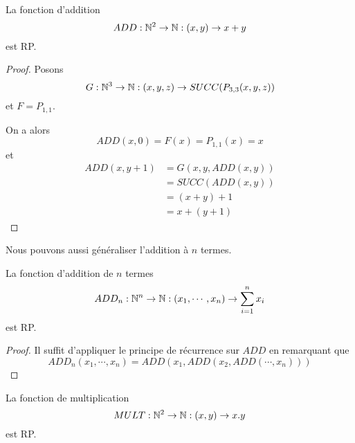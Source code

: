 \begin{exemple} [Addition]
	La fonction d'addition
	\begin{equation}
		ADD : \mathbb{N}^{2} \rightarrow \mathbb{N} : (x, y) \rightarrow x + y
	\end{equation}
	est RP.
\end{exemple}

\ifdefined\outputproof
\begin{proof}
	Posons
	\begin{equation}
		G : \mathbb{N}^{3} \rightarrow \mathbb{N} : (x, y, z) \rightarrow SUCC(P_{3,
		3}(x, y, z))
	\end{equation}
	et $F = P_{1, 1}$.

	On a alors
	\begin{equation}
		ADD(x, 0) = F(x) = P_{1, 1}(x) = x
	\end{equation}
	et
	\begin{align}
		ADD(x, y + 1) &= G(x, y, ADD(x, y)) \\
		&= SUCC(ADD(x, y)) \\
		&= (x + y) + 1 \\
		&= x + (y + 1)
	\end{align}
\end{proof}
\fi

Nous pouvons aussi généraliser l'addition à $n$ termes.

\begin{exemple} 
	La fonction d'addition de $n$ termes
	\begin{equation}
		ADD_{n} : \mathbb{N}^{n} \rightarrow \mathbb{N} : (x_{1}, \cdots, x_{n})
		\rightarrow \sum_{i = 1}^{n} x_{i}
	\end{equation}
	est RP.
\end{exemple}

\ifdefined\outputproof
\begin{proof}
	Il suffit d'appliquer le principe de récurrence sur $ADD$ en remarquant que
	\begin{equation}
		ADD_{n}(x_{1}, \cdots, x_{n}) = ADD(x_{1}, ADD(x_{2}, ADD(\cdots,
		x_{n})))
	\end{equation}
\end{proof}
\fi

\begin{exemple} [Multiplication]
	La fonction de multiplication
	\begin{equation}
		MULT : \mathbb{N}^{2} \rightarrow \mathbb{N} : (x, y) \rightarrow x . y
	\end{equation}
	est RP.
\end{exemple}

